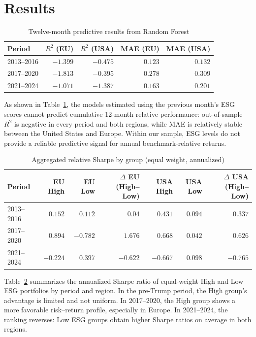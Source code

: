 \documentclass[12pt,a4paper]{article}
\begin{document}
\section{Results}

\begin{table}[H]
\centering
\caption{Twelve-month predictive results from Random Forest}
\label{tab:rf}
\small
\begin{tabular}{lrrrr}
\toprule
\textbf{Period} & \textbf{$R^2$ (EU)} & \textbf{$R^2$ (USA)} & \textbf{MAE (EU)} & \textbf{MAE (USA)} \\
\midrule
2013--2016 & $-1.399$ & $-0.475$ & $0.123$ & $0.132$ \\
2017--2020 & $-1.813$ & $-0.395$ & $0.278$ & $0.309$ \\
2021--2024 & $-1.071$ & $-1.387$ & $0.163$ & $0.201$ \\
\bottomrule
\end{tabular}
\end{table}

As shown in Table~\ref{tab:rf}, the models estimated using the previous month's ESG scores cannot predict cumulative 12-month relative performance: out-of-sample $R^2$ is negative in every period and both regions, while MAE is relatively stable between the United States and Europe. Within our sample, ESG levels do not provide a reliable predictive signal for annual benchmark-relative returns.

\begin{table}[H]
\centering
\caption{Aggregated relative Sharpe by group (equal weight, annualized)}
\label{tab:sharpe}
\small
\setlength{\tabcolsep}{4pt}
\begin{tabular}{lrrrrrr}
\toprule
\textbf{Period} & \textbf{EU High} & \textbf{EU Low} & \shortstack{$\Delta$ EU\\(High--Low)} & \textbf{USA High} & \textbf{USA Low} & \shortstack{$\Delta$ USA\\(High--Low)} \\
\midrule
2013--2016 & $0.152$ & $0.112$ & $0.04$ & $0.431$ & $0.094$ & $0.337$ \\
2017--2020 & $0.894$ & $-0.782$ & $1.676$ & $0.668$ & $0.042$ & $0.626$ \\
2021--2024 & $-0.224$ & $0.397$ & $-0.622$ & $-0.667$ & $0.098$ & $-0.765$ \\
\bottomrule
\end{tabular}
\end{table}

Table~\ref{tab:sharpe} summarizes the annualized Sharpe ratio of equal-weight High and Low ESG portfolios by period and region. In the pre-Trump period, the High group's advantage is limited and not uniform. In 2017--2020, the High group shows a more favorable risk--return profile, especially in Europe. In 2021--2024, the ranking reverses: Low ESG groups obtain higher Sharpe ratios on average in both regions.
\end{document}
